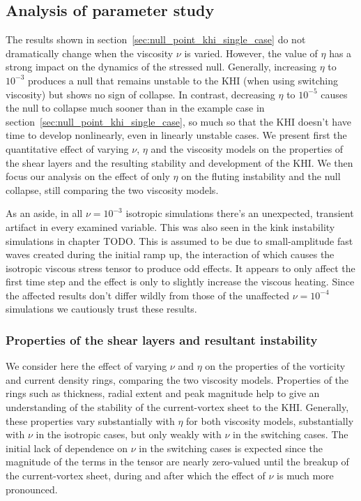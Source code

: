 \subsection{Analysis of parameter study}

The results shown in section~\ref{sec:null_point_khi_single_case} do not dramatically change when the viscosity $\nu$ is varied. However, the value of $\eta$ has a strong impact on the dynamics of the stressed null. Generally, increasing $\eta$ to $10^{-3}$ produces a null that remains unstable to the KHI (when using switching viscosity) but shows no sign of collapse. In contrast, decreasing $\eta$ to $10^{-5}$ causes the null to collapse much sooner than in the example case in section~\ref{sec:null_point_khi_single_case}, so much so that the KHI doesn't have time to develop nonlinearly, even in linearly unstable cases. We present first the quantitative effect of varying $\nu$, $\eta$ and the viscosity models on the properties of the shear layers and the resulting stability and development of the KHI. We then focus our analysis on the effect of only $\eta$ on the fluting instability and the null collapse, still comparing the two viscosity models.

As an aside, in all $\nu = 10^{-3}$ isotropic simulations there's an unexpected, transient artifact in every examined variable. This was also seen in the kink instability simulations in chapter TODO. This is assumed to be due to small-amplitude fast waves created during the initial ramp up, the interaction of which causes the isotropic viscous stress tensor to produce odd effects. It appears to only affect the first time step and the effect is only to slightly increase the viscous heating. Since the affected results don't differ wildly from those of the unaffected $\nu=10^{-4}$ simulations we cautiously trust these results.

\subsubsection{Properties of the shear layers and resultant instability}

We consider here the effect of varying $\nu$ and $\eta$ on the properties of the vorticity and current density rings, comparing the two viscosity models. Properties of the rings such as thickness, radial extent and peak magnitude help to give an understanding of the stability of the current-vortex sheet to the KHI. Generally, these properties vary substantially with $\eta$ for both viscosity models, substantially with $\nu$ in the isotropic cases, but only weakly with $\nu$ in the switching cases. The initial lack of dependence on $\nu$ in the switching cases is expected since the magnitude of the terms in the tensor are nearly zero-valued until the breakup of the current-vortex sheet, during and after which the effect of $\nu$ is much more pronounced.

